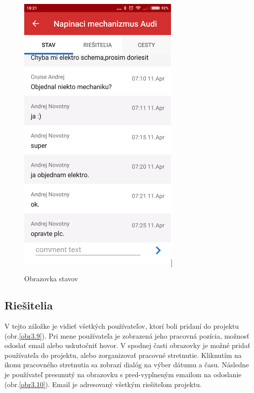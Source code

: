 \vspace{10pt}
\begin{figure}[H]

    \begin{center}
        \begin{minipage}{0.7\linewidth}
            \begin{center}
               \includegraphics[width=0.7\textwidth]{images/screenz/stavy.png}]   
                \caption{Obrazovka stavov}
                \label{obr3.8}
            \end{center}
        \end{minipage}
    \end{center}
    
\end{figure}
\vspace{10pt}
\pagebreak
\subsection{Riešitelia}

V tejto záložke je vidieť všetkých používateľov, ktorí boli pridaní do projektu (obr.\ref{obr3.9}). Pri mene používateľa je zobrazená jeho pracovná pozícia, možnosť odoslať email alebo uskutočniť hovor. V spodnej časti obrazovky je možné pridať používateľa do projektu, alebo zorganizovať pracovné stretnutie. Kliknutím na ikonu pracovného stretnutia sa zobrazí dialóg na výber dátumu a času. Následne je používateľ presunutý na obrazovku s pred-vyplneným emailom na odoslanie (obr.\ref{obr3.10}). Email je adresovaný všetkým riešiteľom projektu.

